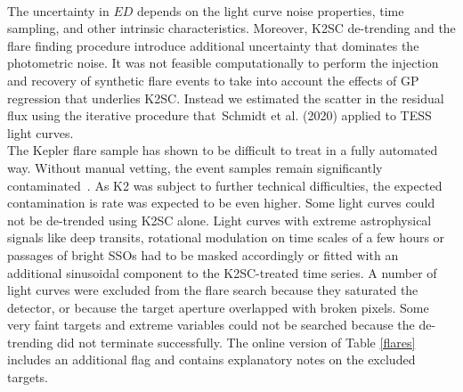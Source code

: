 \documentclass{aa}
\begin{document}
\\
The uncertainty in $ED$ depends on the light curve noise properties, time sampling, and other intrinsic characteristics. Moreover, K2SC de-trending and the flare finding procedure introduce additional uncertainty that dominates the photometric noise. It was not feasible computationally to perform the injection and recovery of synthetic flare events to take into account the effects of GP regression that underlies K2SC. Instead we estimated the scatter in the residual flux using the iterative procedure that~Schmidt et al. (2020) applied to TESS light curves.
\\
The Kepler flare sample has shown to be difficult to treat in a fully automated way. Without manual vetting, the event samples remain significantly contaminated~\citep{yang_keplerflares_2019}. As K2 was subject to further technical difficulties, the expected contamination is rate was expected to be even higher. Some light curves could not be de-trended using K2SC alone. Light curves with extreme astrophysical signals like deep transits, rotational modulation on time scales of a few hours or passages of bright SSOs had to be masked accordingly or fitted with an additional sinusoidal component to the K2SC-treated time series. A number of light curves were excluded from the flare search because they saturated the detector, or because the target aperture overlapped with broken pixels. Some very faint targets and extreme variables could not be searched because the de-trending did not terminate successfully. The online version of Table \ref{flares} includes an additional flag and contains explanatory notes on the excluded targets.
\\
\end{document}
